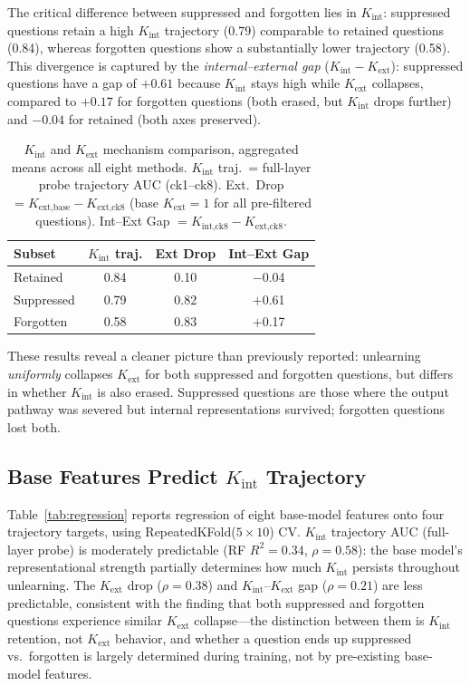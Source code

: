 \documentclass[11pt]{article}
\begin{document}
The critical difference between suppressed and forgotten lies in $K_\text{int}$:
suppressed questions retain a high $K_\text{int}$ trajectory (0.79) comparable
to retained questions (0.84), whereas forgotten questions show a substantially
lower trajectory (0.58).
This divergence is captured by the \emph{internal--external gap}
($K_\text{int} - K_\text{ext}$): suppressed questions have a gap of $+0.61$
because $K_\text{int}$ stays high while $K_\text{ext}$ collapses, compared to
$+0.17$ for forgotten questions (both erased, but $K_\text{int}$ drops further)
and $-0.04$ for retained (both axes preserved).

\begin{table}[t]
\centering
\caption{$K_\text{int}$ and $K_\text{ext}$ mechanism comparison, aggregated
means across all eight methods.
$K_\text{int}$ traj.\ = full-layer probe trajectory AUC (ck1--ck8).
Ext.\ Drop $= K_\text{ext,base} - K_\text{ext,ck8}$ (base $K_\text{ext}=1$ for
all pre-filtered questions).
Int--Ext Gap $= K_\text{int,ck8} - K_\text{ext,ck8}$.}
\label{tab:mechanism}
\small
\setlength{\tabcolsep}{16pt}
\begin{tabular}{lccc}
\toprule
\textbf{Subset} & \textbf{$K_\text{int}$ traj.}
                & \textbf{Ext Drop} & \textbf{Int--Ext Gap} \\
\midrule
Retained   & 0.84 & 0.10 & $-$0.04 \\
Suppressed & 0.79 & 0.82 & $+$0.61 \\
Forgotten  & 0.58 & 0.83 & $+$0.17 \\
\bottomrule
\end{tabular}
\end{table}

These results reveal a cleaner picture than previously reported: unlearning
\emph{uniformly} collapses $K_\text{ext}$ for both suppressed and forgotten
questions, but differs in whether $K_\text{int}$ is also erased.
Suppressed questions are those where the output pathway was severed but internal
representations survived; forgotten questions lost both.

\subsection{Base Features Predict $K_\text{int}$ Trajectory}
\label{sec:regression}

Table~\ref{tab:regression} reports regression of eight base-model features onto
four trajectory targets, using RepeatedKFold($5{\times}10$) CV.
$K_\text{int}$ trajectory AUC (full-layer probe) is moderately predictable
(RF $R^2 = 0.34$, $\rho = 0.58$): the base model's representational strength
partially determines how much $K_\text{int}$ persists throughout unlearning.
The $K_\text{ext}$ drop ($\rho = 0.38$) and $K_\text{int}$--$K_\text{ext}$ gap ($\rho = 0.21$)
are less predictable, consistent with the finding
that both suppressed and forgotten questions experience similar $K_\text{ext}$
collapse---the distinction between them is $K_\text{int}$ retention, not $K_\text{ext}$
behavior, and whether a question ends up suppressed vs.\ forgotten is largely
determined during training, not by pre-existing base-model features.
\end{document}
